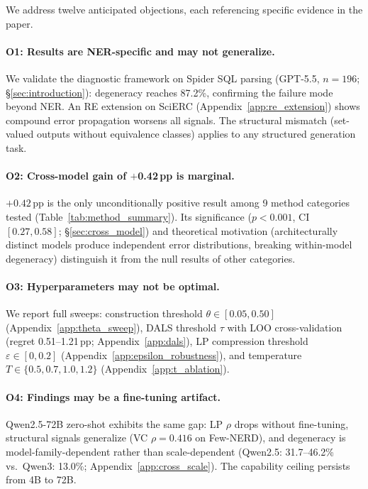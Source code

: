 We address twelve anticipated objections, each referencing specific evidence in the paper.

\paragraph{O1: Results are NER-specific and may not generalize.}
We validate the diagnostic framework on Spider SQL parsing (GPT-5.5, $n{=}196$; \S\ref{sec:introduction}): degeneracy reaches 87.2\%, confirming the failure mode beyond NER. An RE extension on SciERC (Appendix~\ref{app:re_extension}) shows compound error propagation worsens all signals. The structural mismatch (set-valued outputs without equivalence classes) applies to any structured generation task.

\paragraph{O2: Cross-model gain of $+$0.42\,pp is marginal.}
$+0.42$\,pp is the only unconditionally positive result among 9 method categories tested (Table~\ref{tab:method_summary}). Its significance ($p{<}0.001$, CI $[0.27, 0.58]$; \S\ref{sec:cross_model}) and theoretical motivation (architecturally distinct models produce independent error distributions, breaking within-model degeneracy) distinguish it from the null results of other categories.

\paragraph{O3: Hyperparameters may not be optimal.}
We report full sweeps: construction threshold $\theta \in [0.05, 0.50]$ (Appendix~\ref{app:theta_sweep}), DALS threshold $\tau$ with LOO cross-validation (regret 0.51--1.21\,pp; Appendix~\ref{app:dals}), LP compression threshold $\varepsilon \in [0, 0.2]$ (Appendix~\ref{app:epsilon_robustness}), and temperature $T \in \{0.5, 0.7, 1.0, 1.2\}$ (Appendix~\ref{app:t_ablation}).

\paragraph{O4: Findings may be a fine-tuning artifact.}
Qwen2.5-72B zero-shot exhibits the same gap: LP $\rho$ drops without fine-tuning, structural signals generalize (VC $\rho{=}0.416$ on Few-NERD), and degeneracy is model-family-dependent rather than scale-dependent (Qwen2.5: 31.7--46.2\% vs.\ Qwen3: 13.0\%; Appendix~\ref{app:cross_scale}). The capability ceiling persists from 4B to 72B.

